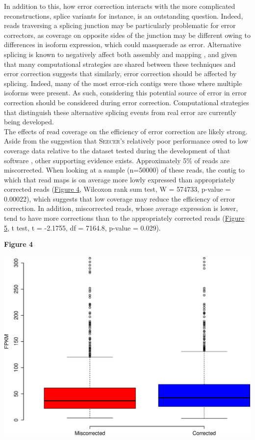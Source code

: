 \documentclass[11pt]{article}
\begin{document}
\noindent
In addition to this, how error correction interacts with the more complicated reconstructions, splice variants for instance, is an outstanding question. Indeed, reads traversing a splicing junction may be particularly problematic for error correctors, as coverage on opposite sides of the junction may be different owing to differences in isoform expression, which could masquerade as error.  Alternative splicing is known to negatively affect both assembly and mapping \citep{Vijay:2012gy,Sammeth:2009jx,Pyrkosz:2013tm}, and given that many computational strategies are shared between these techniques and error correction suggests that similarly, error correction should be affected by splicing. Indeed, many of the most error-rich contigs were those where multiple isoforms were present.  As such, considering this potential source of error in error correction should be considered during error correction. Computational strategies that distinguish these alternative splicing events from real error are currently being developed.   \\
 
\noindent
The effects of read coverage on the efficiency of error correction are likely strong.  Aside from the suggestion that \textsc{Seecer's} relatively poor performance owed to low coverage data relative to the dataset tested during the development of that software \citep{Le:2013dy}, other supporting evidence exists.  Approximately 5\% of reads are miscorrected.  When looking at a sample (n=50000) of these reads, the contig to which that read maps is on average more lowly expressed than appropriately corrected reads (\hyperlink{Figure 4}{Figure 4}, Wilcoxon rank sum test, W = 574733, p-value = 0.00022), which suggests that low coverage may reduce the efficiency of error correction. In addition, miscorrected reads, whose average expression is lower, tend to have more corrections than to the appropriately corrected reads (\hyperlink{Figure 5}{Figure 5}, t test, t = -2.1755, df = 7164.8, p-value = 0.029).

\textbf{\hypertarget{Figure 4}{Figure 4}} \\
\centerline{\includegraphics[width=20.0\baselineskip]{Fig4final.eps}}
\end{document}
